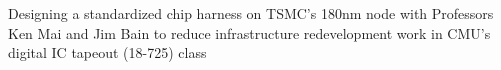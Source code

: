 \item Designing a standardized chip harness on TSMC’s 180nm node with Professors Ken Mai and Jim Bain to reduce infrastructure redevelopment work in CMU’s digital IC tapeout (18-725) class
